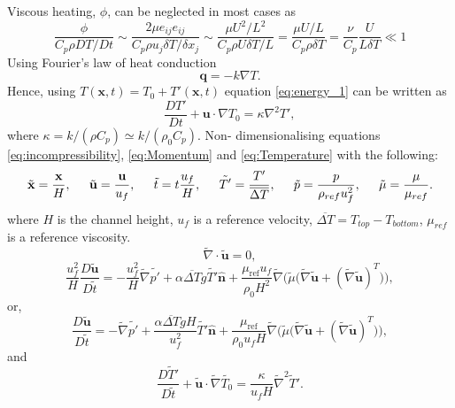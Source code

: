 \documentclass[preprint,12pt]{article}
\begin{document}
Viscous heating, $\phi$, can be neglected in most cases as
\begin{equation}
\frac{\phi}{C_p\rho DT/Dt}\sim \frac{2\mu e_{ij}e_{ij}}{C_p\rho u_j\delta T/\delta x_j}\sim\frac{\mu U^2/L^2}{C_p\rho U \delta T/L}=\frac{\mu U/L}{C_p\rho \delta T}=\frac{\nu}{C_p}\frac{U}{L\delta T}\ll 1
\end{equation}
Using Fourier's law of heat conduction
\begin{equation}
\mathbf{q}=-k \nabla T.
\end{equation}
Hence, using $T(\mathbf{x},t)=T_0+T'(\mathbf{x},t)$ equation \eqref{eq:energy_1} can be written as
\begin{equation}\label{eq:Temperature}
\frac{DT'}{Dt}+\mathbf{u}\cdot\nabla T_0=\kappa \nabla^2T',
\end{equation}
where $\kappa=k/(\rho C_p)\simeq k/(\rho_0 C_p)$.
Non- dimensionalising equations \eqref{eq:incompressibility}, \eqref{eq:Momentum} and \eqref{eq:Temperature} with the following:
\begin{equation}
\tilde{\mathbf{x}}=\frac{\mathbf{x}}{H},\hspace{.2in} \tilde{\mathbf{u}}=\frac{\mathbf{u}}{u_f}, \hspace{.2in} \tilde{t}=t\frac{u_f}{H},\hspace{.2in} \tilde{T'}=\frac{T'}{\overline{\Delta T}},\hspace{.2in}\tilde{p}=\frac{p}{\rho_{ref} u_f^2},\hspace{.2in}\tilde{\mu}=\frac{\mu}{\mu_{ref}}.
\end{equation}
where $H$ is the channel height, $u_f$ is a reference velocity, $\overline{\Delta T}=T_{top}-T_{bottom}$, $\mu_{ref}$ is a reference viscosity.
\begin{equation}
\tilde{\nabla}\cdot\tilde{\mathbf{u}}=0,
\end{equation}
\begin{equation}
\frac{u_f^2}{H}\frac{D\tilde{\mathbf{u}}}{D\tilde{t}}=-\frac{u_f^2}{H}\tilde{\nabla} \tilde{p'}+\alpha {\overline{\Delta T}}g \tilde{T'} \mathbf{\hat{n}}+\frac{\mu_\text{ref}u_f}{\rho_0H^2}\tilde{\nabla}\Big(\tilde{\mu}\big(\tilde{\nabla} \mathbf{\tilde{u}}+(\tilde{\nabla} \mathbf{\tilde{u}})^T\big)\Big),
\end{equation}
or,
\begin{equation}
\frac{D\tilde{\mathbf{u}}}{D\tilde{t}}=-\tilde{\nabla} \tilde{p'}+\frac{\alpha {\overline{\Delta T}}g H}{u_f^2}\tilde{T'} \mathbf{\hat{n}}+\frac{\mu_\text{ref}}{\rho_0u_fH}\tilde{\nabla}\Big(\tilde{\mu}\big(\tilde{\nabla} \mathbf{\tilde{u}}+(\tilde{\nabla} \mathbf{\tilde{u}})^T\big)\Big),
\end{equation}
and
\begin{equation}
\frac{D\tilde{T}'}{D\tilde{t}}+\tilde{\mathbf{u}}\cdot \tilde\nabla \tilde{T_0}=\frac{\kappa}{u_fH} \tilde\nabla^2\tilde{T}'.
\end{equation}
\end{document}
